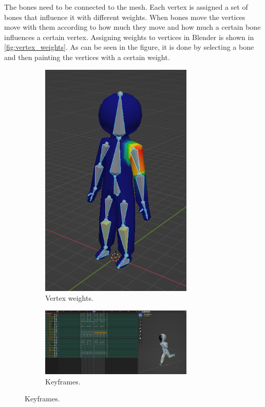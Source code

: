 The bones need to be connected to the mesh.
Each vertex is assigned a set of bones that influence it with different weights.
When bones move the vertices move with them according to how much they move and how much a certain bone influences a certain vertex.
Assigning weights to vertices in Blender is shown in \autoref{fig:vertex_weights}.
As can be seen in the figure, it is done by selecting a bone and then painting the vertices with a certain weight.

\begin{figure}[H]
    \centering
    \begin{subfigure}{0.45\textwidth}
        \centering
        \includegraphics[width=0.8\textwidth]{chapters/theoretical_foundations/sections/models/resources/WeightPaint.png}
        \caption{Vertex weights.}
        \label{fig:vertex_weights}
    \end{subfigure}
    \hfill
    \begin{subfigure}{0.45\textwidth}
        \centering
        \includegraphics[width=0.8\textwidth]{chapters/theoretical_foundations/sections/models/resources/DopeSheet.png}
        \caption{Keyframes.}
        \label{fig:keyframes}
    \end{subfigure}


\end{figure}
